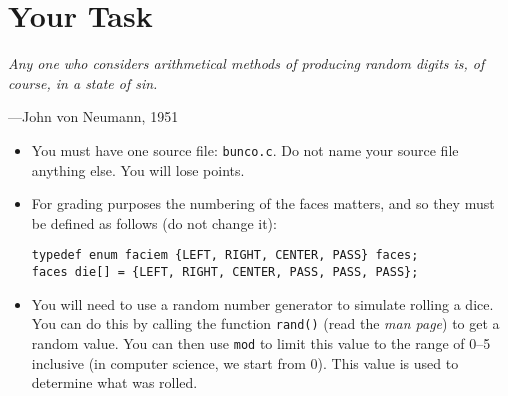\documentclass{article}
\begin{document}

\section{Your Task}
\textwidth
\epigraph{
\emph{Any one who considers arithmetical methods of producing random digits
is, of course, in a state of sin.}}{---John von Neumann, 1951}

\begin{itemize}

\item You must have one source file: \texttt{bunco.c}. Do not name
your source file anything else. You will lose points.


\item For grading purposes the numbering of the faces matters, and
so they must be defined as follows (do not change it):

\begin{lstlisting}
typedef enum faciem {LEFT, RIGHT, CENTER, PASS} faces;
faces die[] = {LEFT, RIGHT, CENTER, PASS, PASS, PASS};
\end{lstlisting}






\item You will need to use a random number generator to simulate
rolling a dice. You can do this by calling the function \texttt{rand()}
(read the \emph{man page}) to get a random value. You can then use \texttt{mod}
to limit this value to the range of 0--5 inclusive (in computer science, we start from 0).
This value is used to determine what was rolled.


\end{itemize}
\end{document}
